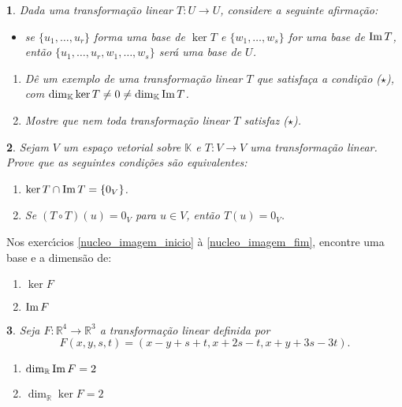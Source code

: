\documentclass[12pt]{exam}
\newtheorem{exercicio}{}
\newcommand{\im}{{\rm Im\,}}
\newcommand{\real}{\mathbb{R}}
\newcommand{\cp}[1]{\mathbb{#1}}
\begin{document}
\begin{exercicio}
  Dada uma transforma\c{c}\~ao linear $T : U \to U$, considere a seguinte afirma\c{c}\~ao:
  \begin{itemize}
    \item[($\star$)] se $\{u_1,\dots,u_r\}$ forma uma base de $\ker T$ e $\{w_1,\dots,w_s\}$ for uma base de $\im T$, ent\~ao $\{u_1,\dots,u_r,w_1,\dots,w_s\}$ ser\'a uma base de $U$.
  \end{itemize}
  \begin{enumerate}[label=({\alph*})]
    \item D\^e um exemplo de uma transforma\c{c}\~ao linear $T$ que satisfa\c{c}a a condi\c{c}\~ao ($\star$), com $\dim_\cp{K}\ker T \ne 0 \ne \dim_\cp{K}\im T$.
    \item Mostre que nem toda transforma\c{c}\~ao linear $T$ satisfaz ($\star$).
  \end{enumerate}
\end{exercicio}

\begin{exercicio}
  Sejam $V$ um espa\c{c}o vetorial sobre $\cp{K}$ e $T : V \to V$ uma transforma\c{c}\~ao linear. Prove que as seguintes condi\c{c}\~oes s\~ao equivalentes:
  \begin{enumerate}
    \item $\ker T \cap \im T = \{0_V\}$.
    \item Se $(T\circ T)(u) = 0_V$ para $u \in V$, ent\~ao $T(u) = 0_V$.
  \end{enumerate}
\end{exercicio}

Nos exerc{\'\i}cios \eqref{nucleo_imagem_inicio} \`a \eqref{nucleo_imagem_fim}, encontre uma base e a dimens\~ao de:
\begin{enumerate}[label=({\alph*})]
    \item $\ker F$
    \item $\im F$
  \end{enumerate}

\begin{exercicio}\label{nucleo_imagem_inicio}
  Seja $F : \real^4 \to \real^3$ a transforma\c{c}\~ao linear definida por
  \[
    F(x,y,s,t) = (x - y + s + t, x + 2s - t, x + y + 3s - 3t).
  \]
  \begin{solucao}
    \begin{enumerate}[label=({\alph*})]
      \item $\dim_\real\im F = 2$
      \item $\dim_\real\ker F = 2$
    \end{enumerate}
  \end{solucao}
\end{exercicio}
\end{document}
